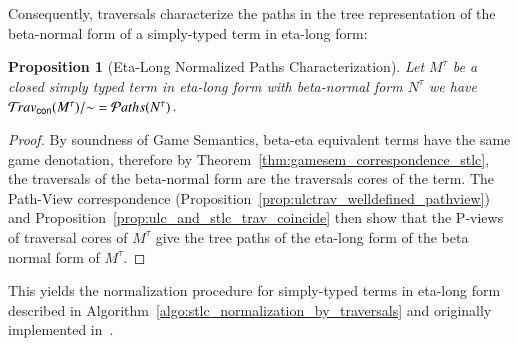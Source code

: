 \documentclass{elsarticle}
\theoremstyle{plain}
\newtheorem{proposition}[theorem]{Proposition}
\theoremstyle{definition}
\theoremstyle{remark}
\newcommand{\concrete}{{\sf con}}
\newcommand{\travsetcon}{{\travset_\concrete}}
\newcommand\pathset{{\mathcal{P}aths}} %
\begin{document}

Consequently, traversals characterize
the paths in the tree representation of the beta-normal form of a simply-typed term in eta-long form:
\begin{proposition}[Eta-Long Normalized Paths Characterization]
\label{prop:path_charact_stlc}
Let $M^\tau$ be a closed simply typed term
in eta-long form with beta-normal form $N^\tau$
we have $\travsetcon(M^\tau)/{\sim} = \pathset(N^\tau)$.
\end{proposition}
\begin{proof}
 By soundness of Game Semantics, beta-eta equivalent terms have the same game denotation, therefore by Theorem~\ref{thm:gamesem_correspondence_stlc}, the traversals of the beta-normal form are the traversals cores of the term. The Path-View correspondence (Proposition~\ref{prop:ulctrav_welldefined_pathview}) and Proposition~\ref{prop:ulc_and_stlc_trav_coincide} then show that the P-views of traversal cores of $M^\tau$ give the tree paths of the eta-long form of the beta normal form of $M^\tau$.
\end{proof}

This yields the normalization procedure for simply-typed terms in eta-long form described in Algorithm~\ref{algo:stlc_normalization_by_traversals} and originally implemented in~\cite{BlumGalop2008, Blum-HogTool}.
\end{document}

